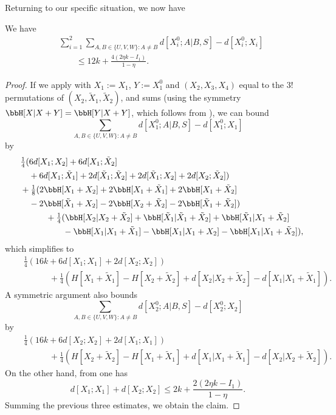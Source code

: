 Returning to our specific situation, we now have

\begin{lemma}\label{dist-diff-bound}\leanok We have
\begin{align*}  &\sum_{i=1}^2 \sum_{A,B \in \{U,V,W\}: A \neq B}  d[X_i^0;A|B, S] - d[X_i^0;X_i]\\
&\qquad \leq 12 k + \frac{4(2 \eta k - I_1)}{1-\eta}.
\end{align*}
\end{lemma}

\begin{proof}\leanok
If we apply  with $X_1:=X_1$, $Y:=X_1^0$ and $(X_2,X_3,X_4)$ equal to the $3!$ permutations of $(X_2,\tilde X_1,\tilde X_2)$, and sums (using the symmetry $\bbH[X|X+Y] = \bbH[Y|X+Y]$, which follows from ), we can bound
$$ \sum_{A,B \in \{U,V,W\}: A \neq B}  d[X_1^0;A|B, S] - d[X_1^0;X_1]$$
by
\begin{align*}
  &\quad \tfrac{1}{4} (6d[X_1;X_2] + 6d[X_1;\tilde X_2]\\
  &\qquad + 6d[X_1;\tilde X_1] + 2d[\tilde X_1;\tilde X_2] + 2 d[\tilde X_1;X_2] + 2d[X_2;\tilde X_2])\\
  &\quad + \tfrac{1}{8} (2\bbH[X_1+X_2] + 2\bbH[X_1+\tilde X_1] + 2 \bbH[X_1+\tilde X_2] \\
  &\qquad - 2\bbH[\tilde X_1+X_2] - 2\bbH[X_2+\tilde X_2] - 2\bbH[\tilde X_1+\tilde X_2])\\
  &\qquad \qquad + \tfrac{1}{4} (\bbH[X_2|X_2+\tilde X_2] + \bbH[\tilde X_1|\tilde X_1+\tilde X_2] + \bbH[\tilde X_1|X_1+\tilde X_2] \\
  &\qquad \qquad \qquad - \bbH[X_1|X_1+\tilde X_1] - \bbH[X_1|X_1+X_2] - \bbH[X_1|X_1+\tilde X_2]),
\end{align*}
which simplifies to
\begin{align*}
  &\quad \tfrac{1}{4} (16k + 6d[X_1;X_1] + 2d[X_2;X_2])\\
  &\qquad \qquad + \tfrac{1}{4} (H[X_1+\tilde X_1] - H[X_2+\tilde X_2] + d[X_2|X_2+\tilde X_2] - d[X_1|X_1+\tilde X_1]).
\end{align*}
A symmetric argument also bounds
$$ \sum_{A,B \in \{U,V,W\}: A \neq B}  d[X_2^0;A|B, S] - d[X_2^0;X_2]$$
by
\begin{align*}
  &\quad \tfrac{1}{4} (16k + 6d[X_2;X_2] + 2d[X_1;X_1])\\
  &\qquad \qquad + \tfrac{1}{4} (H[X_2+\tilde X_2] - H[X_1+\tilde X_1] + d[X_1|X_1+\tilde X_1] - d[X_2|X_2+\tilde X_2]).
\end{align*}
On the other hand, from  one has
$$ d[X_1;X_1] + d[X_2;X_2] \leq 2 k + \frac{2(2 \eta k - I_1)}{1-\eta}.$$
Summing the previous three estimates, we obtain the claim.
\end{proof}

